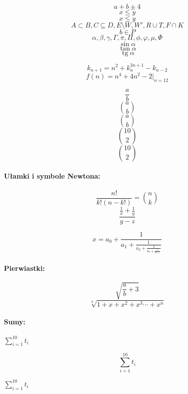 \documentclass[12pt]{article}
\begin{document}
$$a+b\pm 4$$
$$x\leq y$$
$$x\leqslant y$$
$$A \subset B, C \subseteq D, E \setminus W, W', R \cup T, F \cap K$$
$$b\in P$$
$$\alpha, \beta, \gamma, \Gamma, \pi, \Pi, \phi, \varphi,\mu, \Phi$$
$$\sin \alpha$$
$$\tan \alpha$$
$$\operatorname{tg} \alpha$$

$$k_{n+1}=n^2 +k_n^{3n+1}-k_{n-2}$$
$$f(n) = n^4 +4n^2-2 |_{n=12}$$

$$\frac{a}{b}$$
$${a \choose b}$$
$$\binom{a}{b}$$
$${10 \choose 2}$$
$$\binom{10}{2}$$

\paragraph{Ułamki i symbole Newtona:}

$$\frac{n!}{k!(n-k!)}=\binom{n}{k}$$
$$\frac{\frac{1}{x}+\frac{1}{y}}{y-z}$$

$$x=a_0+\frac{1}{a_1+\frac{1}{a_2+\frac{1}{a_3+\frac{1}{a_4+}}}}$$

\paragraph{Pierwiastki:}

$$\sqrt{\frac{a}{b}+3}$$
$$\sqrt[n]{1+x+x^2+x^3\cdots+x^n}$$

\paragraph{Sumy:}

$\sum_{i=1}^{10} t_i$

$$\sum_{i=1}^{10} t_i$$ 

$\sum\limits_{i=1}^{10} t_i$
\end{document}
